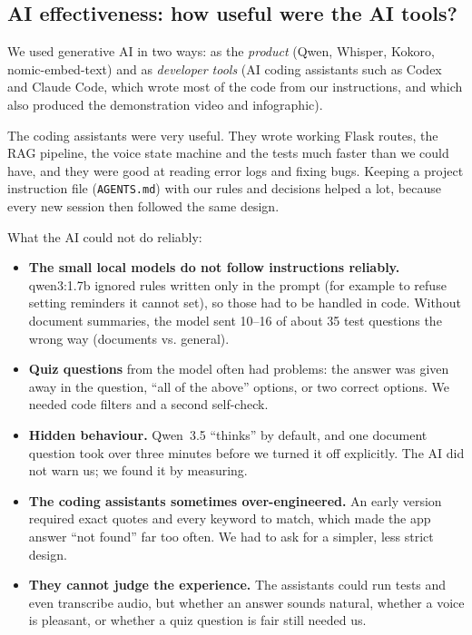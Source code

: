 \documentclass[11pt,a4paper]{article}
\begin{document}
\subsection*{AI effectiveness: how useful were the AI tools?}

We used generative AI in two ways: as the \emph{product} (Qwen, Whisper,
Kokoro, nomic-embed-text) and as \emph{developer tools} (AI coding assistants
such as Codex and Claude Code, which wrote most of the code from our
instructions, and which also produced the demonstration video and infographic).

The coding assistants were very useful. They wrote working Flask routes,
the RAG pipeline, the voice state machine and the tests much faster than we
could have, and they were good at reading error logs and fixing bugs. Keeping
a project instruction file (\texttt{AGENTS.md}) with our rules and decisions
helped a lot, because every new session then followed the same design.

What the AI could not do reliably:
\begin{itemize}[leftmargin=*]
  \item \textbf{The small local models do not follow instructions reliably.}
        qwen3:1.7b ignored rules written only in the prompt (for example to
        refuse setting reminders it cannot set), so those had to be handled in
        code. Without document summaries, the model sent 10--16 of about 35
        test questions the wrong way (documents vs. general).
  \item \textbf{Quiz questions} from the model often had problems: the answer
        was given away in the question, ``all of the above'' options, or two
        correct options. We needed code filters and a second self-check.
  \item \textbf{Hidden behaviour.} Qwen~3.5 ``thinks'' by default, and one
        document question took over three minutes before we turned it off
        explicitly. The AI did not warn us; we found it by measuring.
  \item \textbf{The coding assistants sometimes over-engineered.} An early
        version required exact quotes and every keyword to match, which made
        the app answer ``not found'' far too often. We had to ask for a simpler,
        less strict design.
  \item \textbf{They cannot judge the experience.} The assistants could run
        tests and even transcribe audio, but whether an answer sounds natural,
        whether a voice is pleasant, or whether a quiz question is fair still
        needed us.
\end{itemize}
\end{document}
